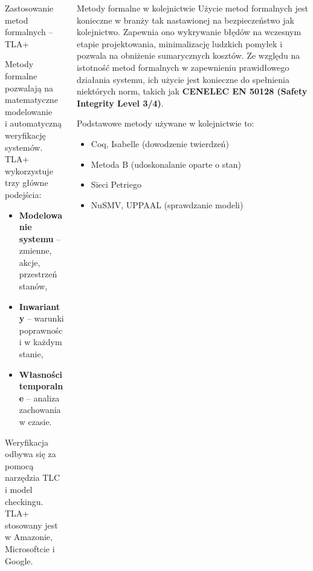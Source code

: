 \documentclass{purdue-poster}
\begin{document}
\begin{frame}{}
\begin{columns}[T]
\begin{column}{.48\linewidth}
\begin{block}{Zastosowanie metod formalnych – TLA+}
\begin{minipage}[c]{0.35\textwidth}
            \vspace{0.5cm}
        \end{minipage}
        \hfill
        \begin{minipage}[c]{0.6\textwidth}
        Metody formalne pozwalają na matematyczne modelowanie\\ i automatyczną weryfikację systemów.\\  
        TLA+ wykorzystuje trzy główne podejścia:
        \begin{itemize}
            \item \textbf{Modelowanie systemu} – zmienne, akcje, przestrzeń stanów,
            \item \textbf{Inwarianty} – warunki poprawności w każdym stanie,
            \item \textbf{Własności temporalne} – analiza zachowania w czasie.
        \end{itemize}
        Weryfikacja odbywa się za pomocą narzędzia TLC i model checkingu. TLA+ stosowany jest w Amazonie, Microsoftcie i Google.
        \end{minipage}
    \end{block}

    \end{column}

    \begin{column}{.48\linewidth}

    \begin{block}{Metody formalne w kolejnictwie}
        Użycie metod formalnych jest konieczne w branży tak nastawionej na bezpieczeństwo jak kolejnictwo. Zapewnia ono wykrywanie błędów na wczesnym etapie projektowania, minimalizację ludzkich pomyłek i pozwala na obniżenie sumarycznych kosztów.
        Ze względu na istotność metod formalnych w zapewnieniu prawidłowego działania systemu, ich użycie jest konieczne do spełnienia niektórych norm, takich jak \textbf{CENELEC EN 50128 (Safety Integrity Level 3/4)}.
        
        Podstawowe metody używane w kolejnictwie to:
        \begin{itemize}
            \item Coq, Isabelle (dowodzenie twierdzeń)
            \item Metoda B (udoskonalanie oparte o stan)
            \item Sieci Petriego
            \item NuSMV, UPPAAL (sprawdzanie modeli)
        \end{itemize}


\end{block}
\end{column}
\end{columns}
\end{frame}
\end{document}
